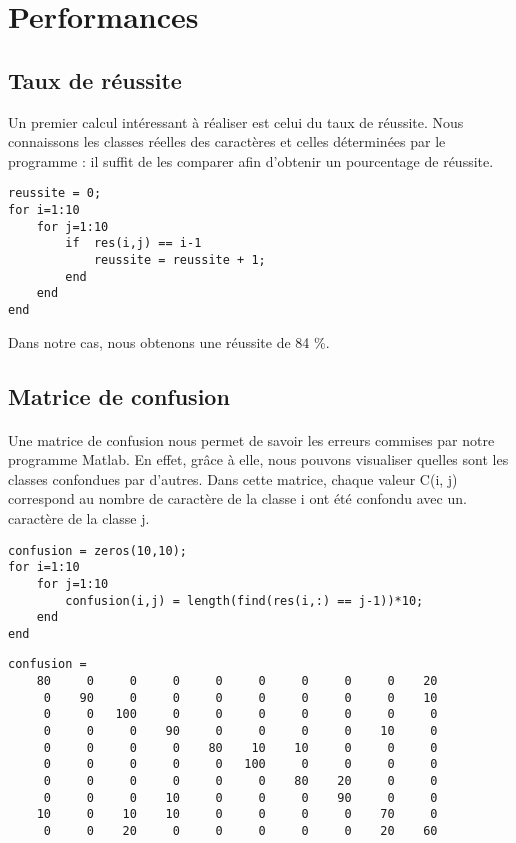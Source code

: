 \section{Performances}

\subsection{Taux de réussite}
Un premier calcul intéressant à réaliser est celui du taux de réussite. Nous connaissons les classes réelles des caractères et celles déterminées par le 
programme : il suffit de les comparer afin d'obtenir un pourcentage de réussite.
\\
\begin{lstlisting}
reussite = 0;
for i=1:10
	for j=1:10
		if  res(i,j) == i-1
			reussite = reussite + 1;
		end
	end
end
\end{lstlisting}

Dans notre cas, nous obtenons une réussite de 84 \%.

\subsection{Matrice de confusion}

\paragraph{}
Une matrice de confusion nous permet de savoir les erreurs commises par notre programme Matlab. En effet, grâce à elle, nous pouvons visualiser quelles sont 
les classes confondues par d'autres. Dans cette matrice, chaque valeur C(i, j) correspond au nombre de caractère de la classe i ont été confondu avec un. 
caractère de la classe j.
\\
\begin{lstlisting}
confusion = zeros(10,10);
for i=1:10
    for j=1:10
        confusion(i,j) = length(find(res(i,:) == j-1))*10;
    end
end
\end{lstlisting}

\begin{lstlisting}
confusion = 
	80     0     0     0     0     0     0     0     0    20
	 0    90     0     0     0     0     0     0     0    10
	 0     0   100     0     0     0     0     0     0     0
	 0     0     0    90     0     0     0     0    10     0
	 0     0     0     0    80    10    10     0     0     0
	 0     0     0     0     0   100     0     0     0     0
	 0     0     0     0     0     0    80    20     0     0
	 0     0     0    10     0     0     0    90     0     0
	10     0    10    10     0     0     0     0    70     0
	 0     0    20     0     0     0     0     0    20    60
\end{lstlisting}
